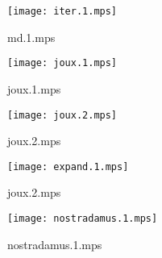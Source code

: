 \documentclass[letterpaper,10pt]{article}
\begin{document}
\begin{figure}
    \centering
    \texttt{[image: iter.1.mps]}
    \caption{md.1.mps}
\end{figure}

\begin{figure}
    \centering
    \texttt{[image: joux.1.mps]}
    \caption{joux.1.mps}
\end{figure}

\begin{figure}
    \centering
    \texttt{[image: joux.2.mps]}
    \caption{joux.2.mps}
\end{figure}

\begin{figure}
    \centering
    \texttt{[image: expand.1.mps]}
    \caption{joux.2.mps}
\end{figure}

\begin{figure}
    \centering
    \texttt{[image: nostradamus.1.mps]}
    \caption{nostradamus.1.mps}
\end{figure}
\end{document}

